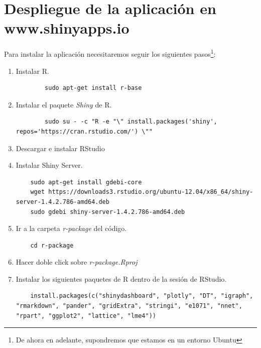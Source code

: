 \chapter[Despligue de la aplicación]{Despliegue de la aplicación en www.shinyapps.io}

Para instalar la aplicación necesitaremos seguir los siguientes pasos\footnote{De ahora en adelante, supondremos que estamos en un entorno Ubuntu}:

\begin{enumerate}
	\item Instalar R.
	
	\begin{verbatim}
		sudo apt-get install r-base
	\end{verbatim}
	
	\item Instalar el paquete \textit{Shiny} de R.
	
	\begin{verbatim}
		sudo su - -c "R -e "\" install.packages('shiny', repos='https://cran.rstudio.com/') \""
	\end{verbatim}
	
	\item Descargar e instalar RStudio~\cite{RStudio}
	
	\item Instalar Shiny Server.
	
	\begin{verbatim}
	sudo apt-get install gdebi-core
	wget https://downloads3.rstudio.org/ubuntu-12.04/x86_64/shiny-server-1.4.2.786-amd64.deb
	sudo gdebi shiny-server-1.4.2.786-amd64.deb
	\end{verbatim}
	
	\item Ir a la carpeta \textit{r-package} del código. 
	
	\begin{verbatim}
	cd r-package
	\end{verbatim}
	
	\item Hacer doble click sobre \textit{r-package.Rproj}
	
	\item Instalar los siguientes paquetes de R dentro de la sesión de RStudio.
	
	\begin{verbatim}
	install.packages(c("shinydashboard", "plotly", "DT", "igraph", "rmarkdown", "pander", "gridExtra", "stringi", "e1071", "nnet", "rpart", "ggplot2", "lattice", "lme4"))
	\end{verbatim}
	

\end{enumerate}
